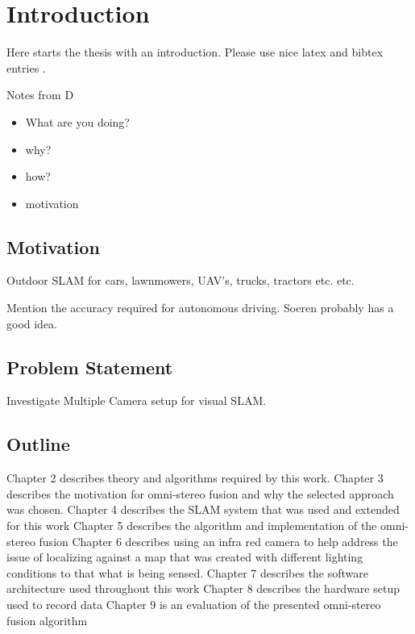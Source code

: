 \chapter{Introduction}
\label{chapter:Introduction}

Here starts the thesis with an introduction. Please use nice latex and bibtex entries \cite{latex}. 

Notes from D
\begin{itemize}
\itemsep0em
 \item What are you doing?
 \item why?
 \item how?
 \item motivation
\end{itemize}

\section{Motivation}

Outdoor SLAM for cars, lawnmowers, UAV's, trucks, tractors etc. etc.

Mention the accuracy required for autonomous driving.  Soeren probably has a good idea.

\section{Problem Statement}

Investigate Multiple Camera setup for visual SLAM.

\section{Outline}
 
Chapter 2 describes theory and algorithms required by this work.  \newline
Chapter 3 describes the motivation for omni-stereo fusion and why the selected approach was chosen.
\newline
Chapter 4 describes the SLAM system that was used and extended for this work \newline
Chapter 5 describes the algorithm and implementation of the omni-stereo fusion \newline
Chapter 6 describes using an infra red camera to help address the issue of localizing against a map
that was created with different lighting conditions to that what is being sensed.\newline
Chapter 7 describes the software architecture used throughout this work \newline
Chapter 8 describes the hardware setup used to record data \newline
Chapter 9 is an evaluation of the presented omni-stereo fusion algorithm \newline